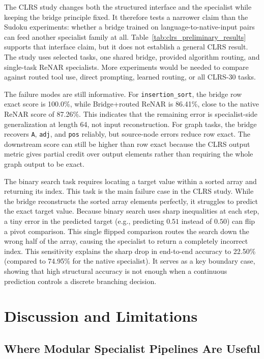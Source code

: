 \documentclass[11pt]{article}
\begin{document}
The CLRS study changes both the structured interface and the specialist while keeping the bridge principle fixed.
It therefore tests a narrower claim than the Sudoku experiments: whether a bridge trained on language-to-native-input pairs can feed another specialist family at all.
Table~\ref{tab:clrs_preliminary_results} supports that interface claim, but it does not establish a general CLRS result.
The study uses selected tasks, one shared bridge, provided algorithm routing, and single-task ReNAR specialists.
More experiments would be needed to compare against routed tool use, direct prompting, learned routing, or all CLRS-30 tasks.

The failure modes are still informative.
For \texttt{insertion\_sort}, the bridge row exact score is 100.0\%, while Bridge+routed ReNAR is 86.41\%, close to the native ReNAR score of 87.26\%.
This indicates that the remaining error is specialist-side generalization at length 64, not input reconstruction.
For graph tasks, the bridge recovers \texttt{A}, \texttt{adj}, and \texttt{pos} reliably, but source-node errors reduce row exact.
The downstream score can still be higher than row exact because the CLRS output metric gives partial credit over output elements rather than requiring the whole graph output to be exact.

The binary search task requires locating a target value within a sorted array and returning its index.
This task is the main failure case in the CLRS study.
While the bridge reconstructs the sorted array elements perfectly, it struggles to predict the exact target value.
Because binary search uses sharp inequalities at each step, a tiny error in the predicted target (e.g., predicting $0.51$ instead of $0.50$) can flip a pivot comparison.
This single flipped comparison routes the search down the wrong half of the array, causing the specialist to return a completely incorrect index.
This sensitivity explains the sharp drop in end-to-end accuracy to 22.50\% (compared to 74.95\% for the native specialist).
It serves as a key boundary case, showing that high structural accuracy is not enough when a continuous prediction controls a discrete branching decision.

\section{Discussion and Limitations}
\label{sec:discussion_limitations}

\subsection{Where Modular Specialist Pipelines Are Useful}
\label{sec:broader_modular_use_cases}
\end{document}
